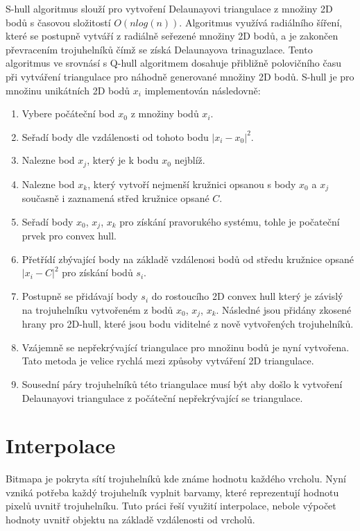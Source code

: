 \documentclass[czech,bachelor,dept460,male,csharp,cpdeclaration]{diploma}
\begin{document}
	S-hull algoritmus slouží pro vytvoření Delaunayovi triangulace z množiny 2D bodů s časovou složitostí $O(n  log(n))$. Algoritmus využívá radiálního šíření, které se postupně vytváří z radiálně seřezené množiny 2D bodů, a je zakončen převracením trojuhelníků čímž se získá Delaunayova trinaguzlace. Tento algoritmus ve srovnásí s Q-hull algoritmem dosahuje přibližně polovičního času při vytváření triangulace pro náhodně generované množiny 2D bodů. S-hull je pro množinu unikátních 2D bodů $x_i$ implementován následovně:
	\begin{enumerate}
		\item Vybere počáteční bod $x_0$ z množiny bodů $x_i$.
		\item Seřadí body dle vzdálenosti od tohoto bodu $|x_i - x_0|^2$.
		\item Nalezne bod $x_j$, který je k bodu $x_0$ nejblíž.
		\item Nalezne bod $x_k$, který vytvoří nejmenší kružnici opsanou s body $x_0$ a $x_j$ současně i zaznamená střed kružnice opsané $C$.
		\item Seřadí body $x_0$, $x_j$, $x_k$ pro získání pravorukého systému, tohle je počateční prvek pro convex hull.
		\item Přetřídí zbývající body na základě vzdálenosi bodů od středu kružnice opsané $|x_i - C|^2$ pro získání bodů $s_i$.
		\item Postupně se přidávají body $s_i$ do rostoucího 2D convex hull který je závislý na trojuhelníku vytvořeném z bodů $x_0$, $x_j$, $x_k$. Následné jsou přidány zkosené hrany pro 2D-hull, které jsou bodu viditelné z nově vytvořených trojuhelníků.
		\item Vzájemně se nepřekrývající triangulace pro množinu bodů je nyní vytvořena. Tato metoda je velice rychlá mezi způsoby vytváření 2D triangulace.
		\item Sousední páry trojuhelníků této triangulace musí být  aby došlo k vytvoření Delaunayovi triangulace z počáteční nepřekrývající se triangulace.
	\end{enumerate}
	
	\section{Interpolace}
	
	Bitmapa je pokryta sítí trojuhelníků kde známe hodnotu každého vrcholu. Nyní vzniká potřeba každý trojuhelník vyplnit barvamy, které reprezentují hodnotu pixelů uvnitř trojuhelníku. Tuto práci řeší využití interpolace, nebole výpočet hodnoty uvnitř objektu na základě vzdálenosti od vrcholů.
	
\end{document}
